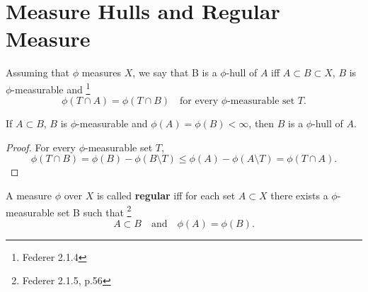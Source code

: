 \section{Measure Hulls and Regular Measure}

\begin{definition}
Assuming that $\phi$ measures $X$, we say that B is a $\phi$-hull 
of $A$ iff $A\subset B\subset X$, $B$ is $\phi$-measurable and
\footnote{Federer 2.1.4}
\[
  \phi(T\cap A)=\phi(T\cap B) \quad \text{for every $\phi$-measurable set $T$}.
\]
\end{definition}

\begin{proposition} \label{P:hull}
If $A\subset B$, $B$ is $\phi$-measurable and $\phi(A)=\phi(B)<\infty$, then $B$
is a $\phi$-hull of $A$.
\end{proposition}

\begin{proof}
For every $\phi$-measurable set $T$,
\[
  \phi(T\cap B)=\phi(B)-\phi(B\setminus T) 
    \le \phi(A)-\phi(A\setminus T)=\phi(T\cap A).
\]
\end{proof}

\begin{definition}
A measure $\phi$ over $X$ is called \textbf{regular} 
iff for each set $A\subset
X$ there exists a $\phi$-measurable set B such that
\footnote{Federer 2.1.5, p.56}
\[
  A\subset B\quad \text{and} \quad \phi(A)=\phi(B).
\]
\end{definition}


